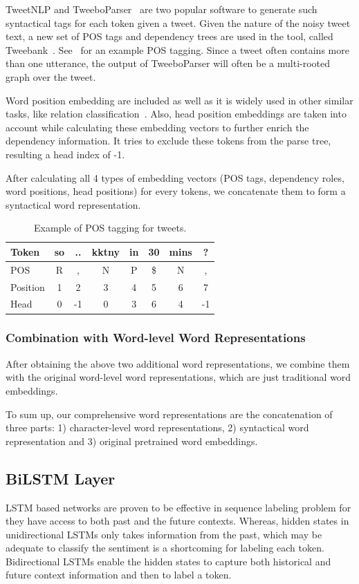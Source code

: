 TweetNLP and TweeboParser~\cite{owoputi2013improved,kong2014dependency} are two popular software to generate such syntactical tags for each token given a tweet.
Given the nature of the noisy tweet text, a new set of POS tags and dependency trees are used in the tool, called Tweebank~\cite{gimpel2011part}.
See~ for an example POS tagging. 
Since a tweet often contains more than one utterance, the output of TweeboParser will often be a multi-rooted graph over the tweet. 

Word position embedding are included as well as it is widely used in other similar tasks, like relation classification~\cite{xu2016improved}. 
Also, head position embeddings are taken into account while calculating these embedding vectors to further enrich the dependency information. It tries to exclude these tokens from the parse tree, resulting a head index of -1.

After calculating all 4 types of embedding vectors (POS tags, dependency roles, word positions, head positions) for every tokens, we concatenate them to form a syntactical word representation.
\begin{table}[th]
	\small
	\centering
	\caption{Example of POS tagging for tweets.}
	\label{tbl:pos}
	\begin{tabular}{l|c|c|c|c|c|c|c}
		\hline
		Token & so & .. & kktny & in & 30 & mins & ? \\ \hline
		POS   & R  & ,  & N     & P  & \$  & N    & , \\ \hline
		Position & 1&2&3&4&5&6&7\\ \hline
		Head & 0 &-1& 0& 3& 6& 4& -1 \\ \hline
\end{tabular}
\end{table}

\subsubsection{Combination with Word-level Word Representations}
After obtaining the above two additional word representations, we combine them with the original word-level word representations, which are just traditional word embeddings. 

To sum up, our comprehensive word representations are the concatenation of three parts: 1) character-level word representations, 2) syntactical word representation and 3)  original pretrained word embeddings.

\subsection{BiLSTM Layer}
LSTM based networks are proven to be effective in sequence labeling problem for they have access to both past and the future contexts. 
Whereas, hidden states in unidirectional LSTMs only takes information from the past, which may be adequate to classify the sentiment  is a shortcoming for labeling each token.
Bidirectional LSTMs enable the hidden states to capture both historical and future context information and then to label a token.


